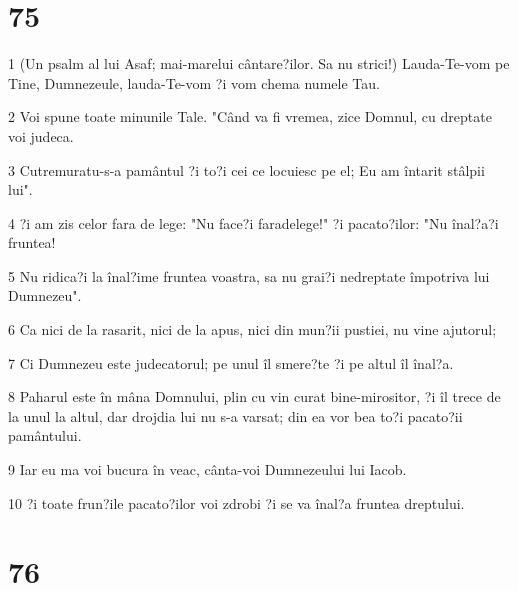 \chapter{75}

\par 1 (Un psalm al lui Asaf; mai-marelui cântare?ilor. Sa nu strici!) Lauda-Te-vom pe Tine, Dumnezeule, lauda-Te-vom ?i vom chema numele Tau.
\par 2 Voi spune toate minunile Tale. "Când va fi vremea, zice Domnul, cu dreptate voi judeca.
\par 3 Cutremuratu-s-a pamântul ?i to?i cei ce locuiesc pe el; Eu am întarit stâlpii lui".
\par 4 ?i am zis celor fara de lege: "Nu face?i faradelege!" ?i pacato?ilor: "Nu înal?a?i fruntea!
\par 5 Nu ridica?i la înal?ime fruntea voastra, sa nu grai?i nedreptate împotriva lui Dumnezeu".
\par 6 Ca nici de la rasarit, nici de la apus, nici din mun?ii pustiei, nu vine ajutorul;
\par 7 Ci Dumnezeu este judecatorul; pe unul îl smere?te ?i pe altul îl înal?a.
\par 8 Paharul este în mâna Domnului, plin cu vin curat bine-mirositor, ?i îl trece de la unul la altul, dar drojdia lui nu s-a varsat; din ea vor bea to?i pacato?ii pamântului.
\par 9 Iar eu ma voi bucura în veac, cânta-voi Dumnezeului lui Iacob.
\par 10 ?i toate frun?ile pacato?ilor voi zdrobi ?i se va înal?a fruntea dreptului.

\chapter{76}


